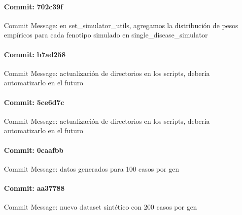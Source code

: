 \documentclass{article}
\begin{document}
\paragraph{Commit: 702c39f}
Commit Message: en set_simulator_utils, agregamos la distribución de pesos empíricos para cada fenotipo simulado en single_disease_simulator

\paragraph{Commit: b7ad258}
Commit Message: actualización de directorios en los scripts, debería automatizarlo en el futuro

\paragraph{Commit: 5ce6d7c}
Commit Message: actualización de directorios en los scripts, debería automatizarlo en el futuro

\paragraph{Commit: 0caafbb}
Commit Message: datos generados para 100 casos por gen

\paragraph{Commit: aa37788}
Commit Message: nuevo dataset sintético con 200 casos por gen

\end{document}
